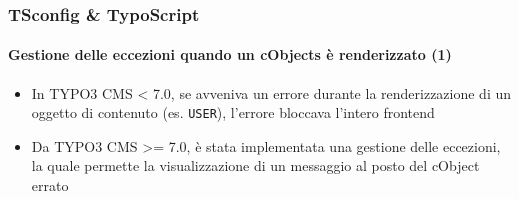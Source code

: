 
\begin{frame}[fragile]
	\frametitle{TSconfig \& TypoScript}
	\framesubtitle{Gestione delle eccezioni quando un cObjects è renderizzato (1)}

	\begin{itemize}
		\item In TYPO3 CMS < 7.0, se avveniva un errore durante la renderizzazione di un oggetto di contenuto (es. \texttt{USER}), l'errore bloccava l'intero frontend
		\item Da TYPO3 CMS >= 7.0, è stata implementata una gestione delle eccezioni, la quale permette la visualizzazione di un messaggio al posto del cObject errato
	\end{itemize}

%

\end{frame}


